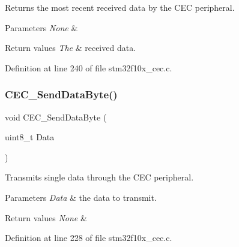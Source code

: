 Returns the most recent received data by the C\+EC peripheral. 


\begin{DoxyParams}{Parameters}
{\em None} & \\
\hline
\end{DoxyParams}

\begin{DoxyRetVals}{Return values}
{\em The} & received data. \\
\hline
\end{DoxyRetVals}


Definition at line 240 of file stm32f10x\+\_\+cec.\+c.

\mbox{\label{group___c_e_c___exported___functions_ga6897ab26d8f909f9160e9fac54b97441}} 
\subsubsection{\texorpdfstring{C\+E\+C\+\_\+\+Send\+Data\+Byte()}{CEC\_SendDataByte()}}
{\footnotesize\ttfamily void C\+E\+C\+\_\+\+Send\+Data\+Byte (\begin{DoxyParamCaption}\item[{uint8\+\_\+t}]{Data }\end{DoxyParamCaption})}



Transmits single data through the C\+EC peripheral. 


\begin{DoxyParams}{Parameters}
{\em Data} & the data to transmit. \\
\hline
\end{DoxyParams}

\begin{DoxyRetVals}{Return values}
{\em None} & \\
\hline
\end{DoxyRetVals}


Definition at line 228 of file stm32f10x\+\_\+cec.\+c.

\mbox{\label{group___c_e_c___exported___functions_gad2fc626e28a82008a29f062975a9af11}} 
